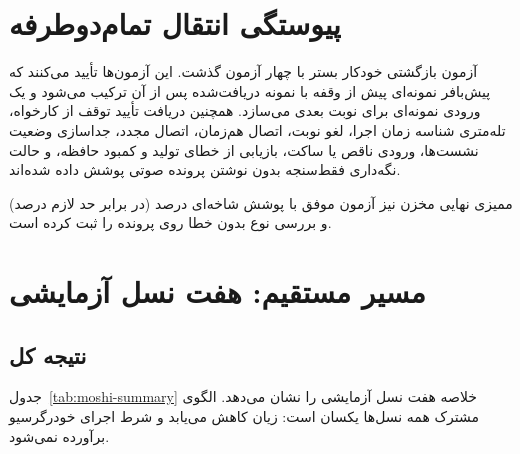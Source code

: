 
\section{پیوستگی انتقال تمام‌دوطرفه}
\label{sec:res-duplex}

آزمون بازگشتی خودکار بستر  با چهار آزمون گذشت. این آزمون‌ها
تأیید می‌کنند که پیش‌بافر  نمونه‌ای پیش از وقفه با 
نمونه دریافت‌شده پس از آن ترکیب می‌شود و یک ورودی  نمونه‌ای برای
نوبت بعدی می‌سازد. همچنین دریافت تأیید توقف از کارخواه، تله‌متری شناسه
زمان اجرا، لغو نوبت، اتصال هم‌زمان، اتصال مجدد، جداسازی وضعیت نشست‌ها،
ورودی ناقص یا ساکت، بازیابی از خطای تولید و کمبود حافظه، و حالت
نگه‌داری فقط‌سنجه بدون نوشتن پرونده صوتی پوشش داده شده‌اند.

ممیزی نهایی مخزن نیز  آزمون موفق با پوشش شاخه‌ای  درصد
(در برابر حد لازم  درصد) و بررسی نوع بدون خطا روی  پرونده را
ثبت کرده است.


\section{مسیر مستقیم: هفت نسل آزمایشی}
\label{sec:res-moshi}

\subsection{نتیجه کل}

جدول~\ref{tab:moshi-summary} خلاصه هفت نسل آزمایشی را نشان می‌دهد. الگوی
مشترک همه نسل‌ها یکسان است: زیان کاهش می‌یابد و شرط اجرای خودرگرسیو
برآورده نمی‌شود.


